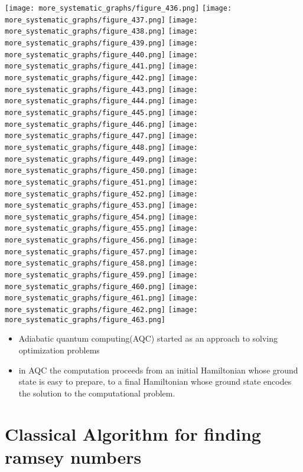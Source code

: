 \documentclass{Assignment}
\begin{document}
\texttt{[image: more\_systematic\_graphs/figure\_436.png]}
\texttt{[image: more\_systematic\_graphs/figure\_437.png]}
\texttt{[image: more\_systematic\_graphs/figure\_438.png]}
\texttt{[image: more\_systematic\_graphs/figure\_439.png]}
\texttt{[image: more\_systematic\_graphs/figure\_440.png]}
\texttt{[image: more\_systematic\_graphs/figure\_441.png]}
\texttt{[image: more\_systematic\_graphs/figure\_442.png]}
\texttt{[image: more\_systematic\_graphs/figure\_443.png]}
\texttt{[image: more\_systematic\_graphs/figure\_444.png]}
\texttt{[image: more\_systematic\_graphs/figure\_445.png]}
\texttt{[image: more\_systematic\_graphs/figure\_446.png]}
\texttt{[image: more\_systematic\_graphs/figure\_447.png]}
\texttt{[image: more\_systematic\_graphs/figure\_448.png]}
\texttt{[image: more\_systematic\_graphs/figure\_449.png]}
\texttt{[image: more\_systematic\_graphs/figure\_450.png]}
\texttt{[image: more\_systematic\_graphs/figure\_451.png]}
\texttt{[image: more\_systematic\_graphs/figure\_452.png]}
\texttt{[image: more\_systematic\_graphs/figure\_453.png]}
\texttt{[image: more\_systematic\_graphs/figure\_454.png]}
\texttt{[image: more\_systematic\_graphs/figure\_455.png]}
\texttt{[image: more\_systematic\_graphs/figure\_456.png]}
\texttt{[image: more\_systematic\_graphs/figure\_457.png]}
\texttt{[image: more\_systematic\_graphs/figure\_458.png]}
\texttt{[image: more\_systematic\_graphs/figure\_459.png]}
\texttt{[image: more\_systematic\_graphs/figure\_460.png]}
\texttt{[image: more\_systematic\_graphs/figure\_461.png]}
\texttt{[image: more\_systematic\_graphs/figure\_462.png]}
\texttt{[image: more\_systematic\_graphs/figure\_463.png]}
\newpage
\begin{itemize}
	\item  Adiabatic quantum computing(AQC) started as an approach to solving optimization problems
	\item in AQC the computation proceeds from an initial Hamiltonian whose ground
	state is easy to prepare, to a final Hamiltonian whose
	ground state encodes the solution to the computational problem.
\end{itemize}
\newpage

\section*{Classical Algorithm for finding ramsey numbers}
\end{document}
